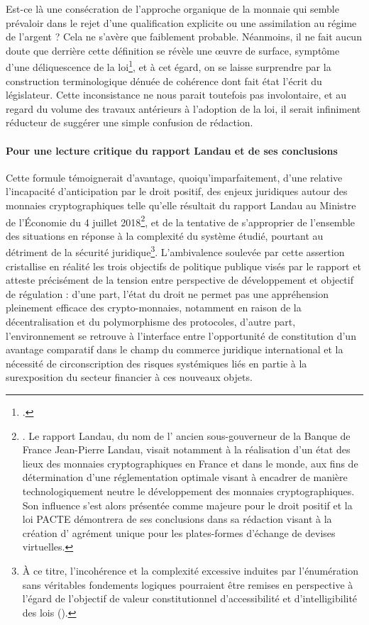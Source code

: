 { Est-ce là une consécration de l'approche organique de la monnaie qui semble prévaloir dans le rejet d'une qualification explicite ou une assimilation au régime de l'argent ? Cela ne s'avère que faiblement probable. Néanmoins, il ne fait aucun doute que derrière cette définition se révèle une \oe{}uvre de surface, symptôme d'une déliquescence de la loi\footnote{.}, et à cet égard, on se laisse surprendre par la construction terminologique dénuée de cohérence dont fait état l'écrit du législateur. Cette inconsistance ne nous parait toutefois pas involontaire, et au regard du volume des travaux antérieurs à l'adoption de la loi, il serait infiniment réducteur de suggérer une simple confusion de rédaction. 

\paragraph{Pour une lecture critique du rapport Landau et de ses conclusions}

Cette formule témoignerait d'avantage, quoiqu'imparfaitement, d'une relative l'incapacité d'anticipation par le droit positif, des enjeux juridiques autour des monnaies cryptographiques telle qu'elle résultait du rapport Landau au Ministre de l'Économie du 4 juillet 2018\footnote{. Le rapport Landau, du nom de l' ancien sous-gouverneur de la Banque de France Jean-Pierre Landau, visait notamment à la réalisation d'un état des lieux des monnaies cryptographiques en France et dans le monde, aux fins de détermination d'une réglementation optimale visant à encadrer de manière technologiquement neutre le développement des monnaies cryptographiques. Son influence s'est alors présentée comme majeure pour le droit positif et la loi PACTE démontrera de ses conclusions dans sa rédaction visant à la création d' agrément unique pour les plates-formes d'échange de devises virtuelles.}, et de la tentative de s'approprier de l'ensemble des situations en réponse à la complexité du système étudié, pourtant au détriment de la sécurité juridique\footnote{À ce titre, l'incohérence et la complexité excessive induites par l'énumération sans véritables fondements logiques pourraient être remises en perspective à l'égard de l'objectif de valeur constitutionnel d'accessibilité et d'intelligibilité des lois ().}. L'ambivalence soulevée par cette assertion cristallise en réalité les trois objectifs de politique publique visés par le rapport et atteste précisément de la tension entre perspective de développement et objectif de régulation : d'une part, l'état du droit ne permet pas une appréhension pleinement efficace des crypto-monnaies, notamment en raison de la décentralisation et du polymorphisme des protocoles, d'autre part, l'environnement se retrouve à l'interface entre l'opportunité de constitution d'un avantage comparatif dans le champ du commerce juridique international et la nécessité de circonscription des risques systémiques liés en partie à la surexposition du secteur financier à ces nouveaux objets.\par

}
